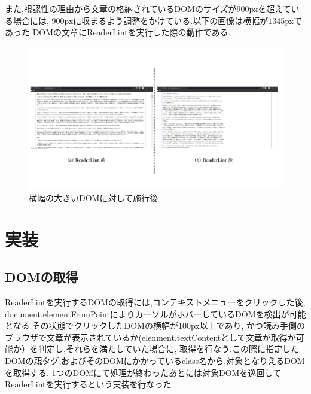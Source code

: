 また,視認性の理由から文章の格納されているDOMのサイズが900pxを超えている場合には,
900pxに収まるよう調整をかけている.以下の画像は横幅が1345pxであった
DOMの文章にReaderLintを実行した際の動作である.\footnotemark[2]


\begin{figure}[H]
    \centering
    \label{fig:image12}
    \includegraphics[width=0.8\columnwidth]{image/03/img8.png}
	\caption[幅の大きいDOMに対して施行後]{横幅の大きいDOMに対して施行後}
\end{figure}

\section{実装}

\subsection{DOMの取得}
ReaderLintを実行するDOMの取得には,コンテキストメニューをクリックした後,
document.elementFromPointによりカーソルがホバーしているDOMを検出が可能となる.その状態でクリックしたDOMの横幅が100px以上であり,
かつ読み手側のブラウザで文章が表示されているか(elenment.textContentとして文章が取得が可能か）を判定し,それらを満たしていた場合に,
取得を行なう.この際に指定したDOMの親タグ,およびそのDOMにかかっているclass名から,対象となりえるDOMを取得する.
1つのDOMにて処理が終わったあとには対象DOMを巡回してReaderLintを実行するという実装を行なった

